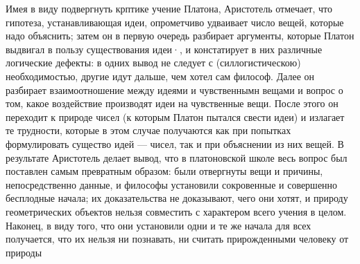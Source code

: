 \documentclass{article}
\begin{document}
Имея в виду подвергнуть крптике учение Платона, Аристотель отмечает, что гипотеза, устанавливающая идеи, опрометчиво удваивает число вещей, которые надо объяснить; затем он в первую очередь разбирает аргументы, которые Платон выдвигал в пользу существования идеи·, и констатирует в них различные логические дефекты: в одних вывод не следует с (силлогистическою) необходимостью, другие идут дальше, чем хотел сам философ. Далее он разбирает взаимоотношение между идеями и чувственнымн вещами и вопрос о том, какое воздействие производят идеи на чувственные вещи. После этого он переходит к природе чисел (к которым Платон пытался свести идеи) и излагает те трудности, которые в этом случае получаются как при попытках формулировать существо идей — чисел, так и при объяснении из них вещей. В результате Аристотель делает вывод, что в платоновской школе весь вопрос был поставлен самым превратным образом: были отвергнуты вещи и причины, непосредственно данные, и философы установили сокровенные и совершенно бесплодные начала; их доказательства не доказывают, чего они хотят, и природу геометрических объектов нельзя совместить с характером всего учения в целом. Наконец, в виду того, что они установили одни и те же начала для всех получается, что их нельзя ни познавать, ни считать прирожденными человеку от природы
\end{document}
